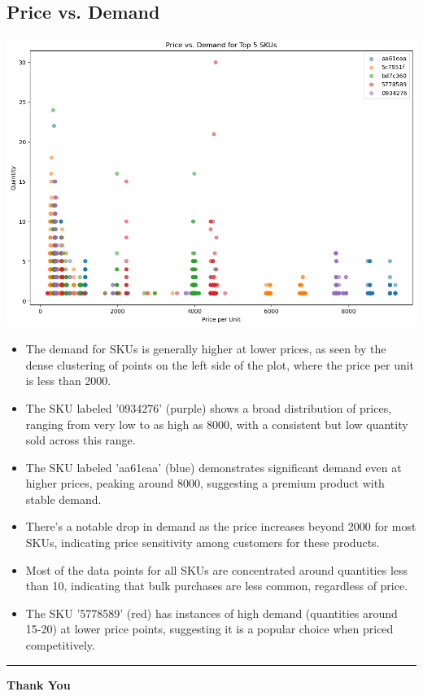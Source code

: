 \documentclass{article}
\begin{document}
    \subsection{Price vs. Demand}
    \begin{center}
        \includegraphics[width=1\columnwidth]{images/price-demand.png}
    \end{center}
    \begin{itemize}
        \item The demand for SKUs is generally higher at lower prices, as seen by the dense clustering of points on the left side of the plot, where the price per unit is less than 2000.
        \item The SKU labeled '0934276' (purple) shows a broad distribution of prices, ranging from very low to as high as 8000, with a consistent but low quantity sold across this range.
        \item The SKU labeled 'aa61eaa' (blue) demonstrates significant demand even at higher prices, peaking around 8000, suggesting a premium product with stable demand.
        \item There's a notable drop in demand as the price increases beyond 2000 for most SKUs, indicating price sensitivity among customers for these products.
        \item Most of the data points for all SKUs are concentrated around quantities less than 10, indicating that bulk purchases are less common, regardless of price.
        \item The SKU '5778589' (red) has instances of high demand (quantities around 15-20) at lower price points, suggesting it is a popular choice when priced competitively.
    \end{itemize}
    

    \newpage

\vfill

\begin{center}
    \color{red}\rule{1\linewidth}{1mm}
    \vspace{4in}

    \Huge\textbf{Thank You}
\end{center}
\vfill
\end{document}
